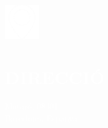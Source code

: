 \documentclass[../main.tex]{subfiles}
\begin{document}
    \hspace*{0.2cm}
    \begin{minipage}[t]{2cm}
        \vspace*{0.75cm}\includegraphics[width=1.5cm]{assets/location.png}
    \end{minipage}
    \begin{minipage}[t]{5cm}

        \vspace*{0.5cm}
        \section*{\textcolor{white}{DIRECCIÓ}}
        \vspace*{-0.25cm}
        \textcolor{white}{
            Mataró, 08301 \\
            Barcelona, Espanya
        }
    \end{minipage}
\end{document}
